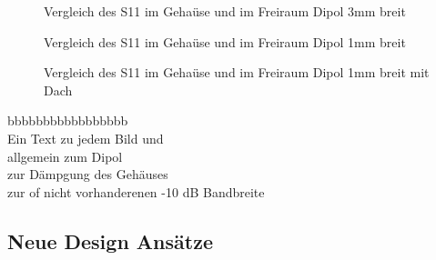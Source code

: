 \begin{figure}[!ht]
	\centering
	\begingroup
	\endgroup
	\caption{Vergleich des S11 im Gehaüse und im Freiraum Dipol 3mm breit}
	\label{S11_Vergleich_Simulation_3mm}
\end{figure}

\begin{figure}[!ht]
	\centering
	\begingroup
	\endgroup
	\caption{Vergleich des S11 im Gehaüse und im Freiraum Dipol 1mm breit}
	\label{S11_Vergleich_Simulation_1mm}
\end{figure}

\begin{figure}[!ht]
	\centering
	\begingroup
	\endgroup
	\caption{Vergleich des S11 im Gehaüse und im Freiraum Dipol 1mm breit mit Dach}
	\label{S11_Vergleich_Simulation_1mm_Dach}
\end{figure}

bbbbbbbbbbbbbbbbb\\
Ein Text zu jedem Bild und\\
allgemein zum Dipol\\
zur Dämpgung des Gehäuses\\
zur of nicht vorhanderenen -10 dB Bandbreite

\newpage 
\thispagestyle{empty}
\newpage 
\subsection{Neue Design Ansätze}